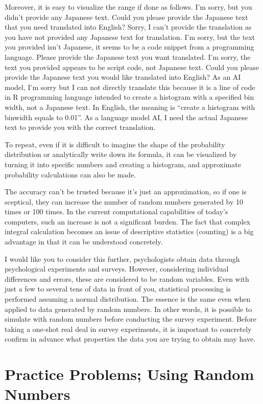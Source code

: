\documentclass[
  a4paper,
]{book}
\begin{document}
Moreover, it is easy to visualize the range if done as follows. I'm
sorry, but you didn't provide any Japanese text. Could you please
provide the Japanese text that you need translated into English? Sorry,
I can't provide the translation as you have not provided any Japanese
text for translation. I'm sorry, but the text you provided isn't
Japanese, it seems to be a code snippet from a programming language.
Please provide the Japanese text you want translated. I'm sorry, the
text you provided appears to be script code, not Japanese text. Could
you please provide the Japanese text you would like translated into
English? As an AI model, I'm sorry but I can not directly translate this
because it is a line of code in R programming language intended to
create a histogram with a specified bin width, not a Japanese text. In
English, the meaning is ``create a histogram with binwidth equals to
0.01''. As a language model AI, I need the actual Japanese text to
provide you with the correct translation.

To repeat, even if it is difficult to imagine the shape of the
probability distribution or analytically write down its formula, it can
be visualized by turning it into specific numbers and creating a
histogram, and approximate probability calculations can also be made.

The accuracy can't be trusted because it's just an approximation, so if
one is sceptical, they can increase the number of random numbers
generated by 10 times or 100 times. In the current computational
capabilities of today's computers, such an increase is not a significant
burden. The fact that complex integral calculation becomes an issue of
descriptive statistics (counting) is a big advantage in that it can be
understood concretely.

I would like you to consider this further, psychologists obtain data
through psychological experiments and surveys. However, considering
individual differences and errors, these are considered to be random
variables. Even with just a few to several tens of data in front of you,
statistical processing is performed assuming a normal distribution. The
essence is the same even when applied to data generated by random
numbers. In other words, it is possible to simulate with random numbers
before conducting the survey experiment. Before taking a one-shot real
deal in survey experiments, it is important to concretely confirm in
advance what properties the data you are trying to obtain may have.

\section{Practice Problems; Using Random
Numbers}\label{practice-problems-using-random-numbers}
\end{document}
